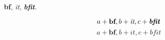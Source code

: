 \documentclass{article}
\begin{document}
\textbf{bf}, \textit{it}, \textbf{\textit{bfit}}.


\[ a+\textbf{bf}, b+\textit{it}, c+\textbf{\textit{bfit}} \]
\[ a+\mathbf{bf}, b+\mathit{it}, c+\mathbf{\mathit{bfit}} \]
\end{document}
